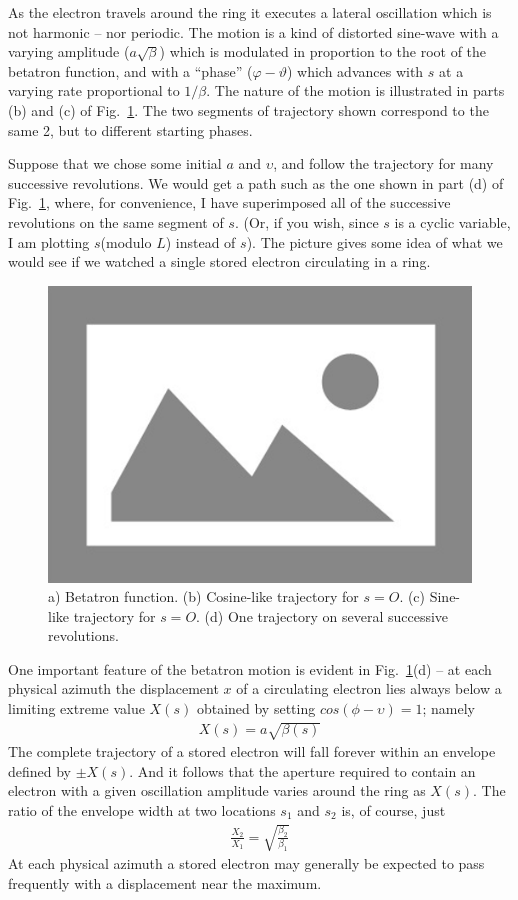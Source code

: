 As the electron travels around the ring it executes a lateral oscillation which is not harmonic -- nor periodic. The motion is a kind of distorted sine-wave with a varying amplitude ($a\sqrt{\beta}$) which is modulated in proportion to the root of the betatron function, and with a “phase” ($\varphi-\vartheta$) which advances with $s$ at a varying rate proportional to $1/\beta$. The nature of the motion is illustrated in parts (b) and (c) of Fig.~\ref{fig:fig12}. The two segments of trajectory shown correspond to the same 2, but to different starting phases.

Suppose that we chose some initial $a$ and $\upsilon$, and follow the trajectory for many successive revolutions. We would get a path such as the one shown in part (d) of Fig.~\ref{fig:fig12}, where, for convenience, I have superimposed all of the successive revolutions on the same segment of $s$. (Or, if you wish, since $s$ is a cyclic variable, I am plotting $s$(modulo $L$) instead of $s$). The picture gives some idea of what we would see if we watched a single stored electron circulating in a ring.

\begin{figure}[!htb]
	\centering
	\includegraphics[width=0.7\linewidth]{./Figuras/placeholder.png}
	\caption{a) Betatron function. (b) Cosine-like trajectory for $s=O$. (c) Sine-like trajectory for $s=O$. (d) One trajectory on several successive revolutions.}
	\label{fig:fig12}
\end{figure}

One important feature of the betatron motion is evident in Fig.~\ref{fig:fig12}(d) -- at each physical azimuth the displacement $x$ of a circulating electron lies always below a limiting extreme value $X(s)$ obtained by setting $cos(\phi - \upsilon) = 1$; namely
\begin{align}
	X(s) = a\sqrt{\beta(s)}
\end{align}
The complete trajectory of a stored electron will fall forever within an envelope defined by $\pm X(s)$. And it follows that the aperture required to contain an electron with a given oscillation amplitude varies around the ring as $X(s)$. The ratio of the envelope width at two locations $s_1$ and $s_2$ is, of course, just
\begin{align}
	\frac{X_2}{X_1} = \sqrt{\frac{\beta_2}{\beta_1}}
\end{align}
At each physical azimuth a stored electron may generally be expected to pass frequently with a displacement near the maximum.


